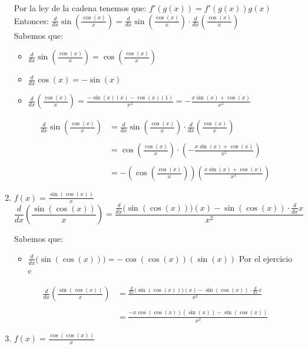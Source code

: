 \documentclass[12pt]{article}
\begin{document}
\begin{enumerate}[\hspace{9px} a)]
        Por la ley de la cadena tenemos que: \(f'(g(x))=f'(g(x))g(x)\)\\

        Entonces: \quad \(\displaystyle\frac{d}{dx}\sin\left(\frac{\cos(x)}{x}\right)=\displaystyle\frac{d}{dx}\sin\left(\frac{\cos(x)}{x}\right)\cdot\frac{d}{dx}\left(\frac{\cos(x)}{x}\right)\)\\

        Sabemos que:
        \begin{itemize}
            \item \(\displaystyle\frac{d}{dx}\sin\left(\frac{\cos(x)}{x}\right)=\cos\left(\frac{\cos(x)}{x}\right)\)
            \item \(\displaystyle\frac{d}{dx}\cos(x)=-\sin(x)\)
            \item \(\displaystyle\frac{d}{dx}\left(\frac{\cos(x)}{x}\right)=\frac{-\sin(x)(x)-\cos(x)(1)}{x^2}=-\frac{x\sin(x)+\cos(x)}{x^2}\)
        \end{itemize}

        \begin{align*}
            \displaystyle\frac{d}{dx}\sin\left(\frac{\cos(x)}{x}\right)&=\frac{d}{dx}\sin\left(\frac{\cos(x)}{x}\right)\cdot\frac{d}{dx}\left(\frac{\cos(x)}{x}\right)\\  \\
            &=\cos\left(\frac{\cos(x)}{x}\right)\cdot\left(-\frac{x\sin(x)+\cos(x)}{x^2}\right)\\ \\
            &=-\left(\cos\left(\frac{\cos(x)}{x}\right)\right)\left(\frac{x\sin(x)+\cos(x)}{x^2}\right)
        \end{align*}
    \item \(f(x) = \displaystyle\frac{\sin(\cos(x))}{x}\)\\

        \begin{equation*}
            \displaystyle\frac{d}{dx}\left(\frac{\sin(\cos(x))}{x}\right)=\frac{\displaystyle\frac{d}{dx}\big(\sin(\cos(x))\big)(x)-\sin(\cos(x))\cdot\frac{d}{dx}x}{x^2}
        \end{equation*}

        Sabemos que:
        \begin{itemize}
            \item \(\displaystyle\frac{d}{dx}\big(\sin(\cos(x))\big)=-\cos(\cos(x))(\sin(x))\) \quad Por el ejercicio c
        \end{itemize}
        \begin{align*}
            \displaystyle\frac{d}{dx}\left(\frac{\sin(\cos(x))}{x}\right)&=\frac{\displaystyle\frac{d}{dx}\big(\sin(\cos(x))\big)(x)-\sin(\cos(x))\cdot\frac{d}{dx}x}{x^2}\\ \\
            &=\frac{-x\cos(\cos(x))(\sin(x))-\sin(\cos(x))}{x^2}
        \end{align*}
    \item \(f(x) = \displaystyle\frac{\cos(\cos(x))}{x}\)\\


\end{enumerate}
\end{document}
